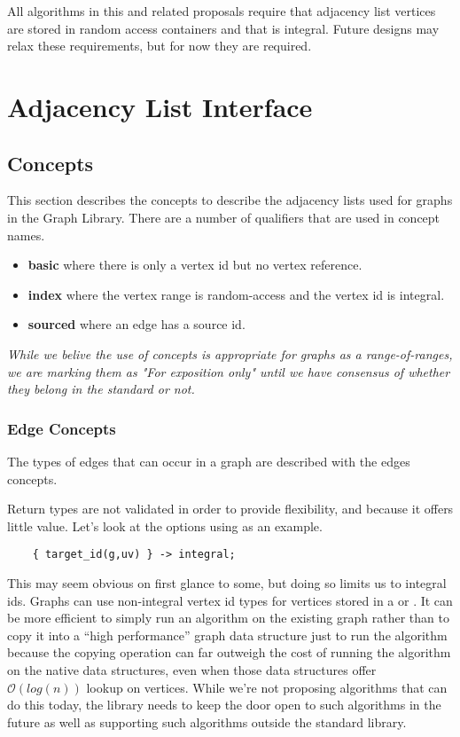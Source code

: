 All algorithms in this and related proposals require that adjacency list vertices are stored in random access containers and that  
is integral. Future designs may relax these requirements, but for now they are required.

\section{Adjacency List Interface}

\subsection{Concepts}

This section describes the concepts to describe the adjacency lists used for graphs in the Graph Library. There are a 
number of qualifiers that are used in concept names.
\begin{itemize}
    \item \textbf{basic} where there is only a vertex id but no vertex reference.
    \item \textbf{index} where the vertex range is random-access and the vertex id is integral.
    \item \textbf{sourced} where an edge has a source id.
\end{itemize}

\emph{While we belive the use of concepts is appropriate for graphs as a range-of-ranges, we are marking them as "For exposition only" 
until we have consensus of whether they belong in the standard or not.}

\subsubsection{Edge Concepts}
The types of edges that can occur in a graph are described with the edges concepts.
{\small
     
}
Return types are not validated in order to provide flexibility, and because it offers little value. Let's look at the options using 
 as an example.

\begin{lstlisting}
    { target_id(g,uv) } -> integral;
\end{lstlisting}
This may seem obvious on first glance to some, but doing so limits us to integral ids. Graphs can use non-integral vertex id types for 
vertices stored in a  or . 
It can be more efficient to simply run an algorithm on the existing graph rather than to copy it into a “high performance” graph data 
structure just to run the algorithm because the copying operation can far outweigh the cost of running the algorithm on the native data 
structures, even when those data structures offer $\mathcal{O}(log(n))$ lookup on vertices. While we're not proposing algorithms that 
can do this today, the library needs to keep the door open to such algorithms in the future as well as supporting such algorithms 
outside the standard library.

